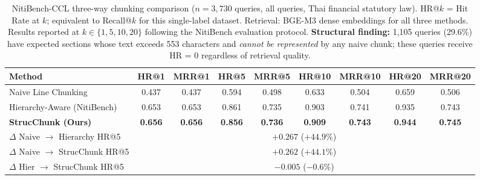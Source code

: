 \documentclass[sn-mathphys,Numbered]{sn-jnl}%
\begin{document}
\begin{table}[htbp]
\centering
\begin{adjustbox}{max width=\textwidth}
\begin{tabular}{lcccccccc}
\toprule
\textbf{Method} & \textbf{HR@1} & \textbf{MRR@1}
               & \textbf{HR@5} & \textbf{MRR@5}
               & \textbf{HR@10} & \textbf{MRR@10}
               & \textbf{HR@20} & \textbf{MRR@20} \\
\midrule
Naive Line Chunking         & 0.437 & 0.437 & 0.594 & 0.498 & 0.633 & 0.504 & 0.659 & 0.506 \\
Hierarchy-Aware (NitiBench) & 0.653 & 0.653 & 0.861 & 0.735 & 0.903 & 0.741 & 0.935 & 0.743 \\
\textbf{StrucChunk (Ours)}  & \textbf{0.656} & \textbf{0.656}
                            & \textbf{0.856} & \textbf{0.736}
                            & \textbf{0.909} & \textbf{0.743}
                            & \textbf{0.944} & \textbf{0.745} \\
\midrule
$\Delta$ Naive $\to$ Hierarchy HR@5   & \multicolumn{8}{c}{$+0.267$ ($+44.9\%$)} \\
$\Delta$ Naive $\to$ StrucChunk HR@5  & \multicolumn{8}{c}{$+0.262$ ($+44.1\%$)} \\
$\Delta$ Hier  $\to$ StrucChunk HR@5  & \multicolumn{8}{c}{$-0.005$ ($-0.6\%$)} \\
\bottomrule
\end{tabular}
\end{adjustbox}
\caption{NitiBench-CCL three-way chunking comparison ($n=3{,}730$ queries,
  all queries, Thai financial statutory law).  HR@$k$ = Hit Rate at $k$;
  equivalent to Recall@$k$ for this single-label dataset.  Retrieval:
  BGE-M3 dense embeddings for all three methods.  Results reported at
  $k\in\{1,5,10,20\}$ following the NitiBench evaluation protocol.
  \textbf{Structural finding:} 1,105 queries (29.6\%) have expected
  sections whose text exceeds 553 characters and \emph{cannot be
  represented} by any naive chunk; these queries receive HR = 0 regardless
  of retrieval quality.}
\label{tab:niti_three_way}
\end{table}
\end{document}
